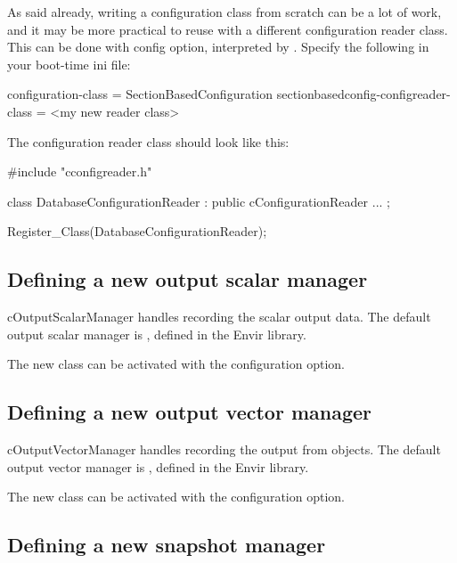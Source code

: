 As said already, writing a configuration class from scratch can
be a lot of work, and it may be more practical to reuse
 with a different configuration
reader class. This can be done with 
config option, interpreted by .
Specify the following in your boot-time ini file:

\begin{inifile}
[General]
configuration-class = SectionBasedConfiguration
sectionbasedconfig-configreader-class = <my new reader class>
\end{inifile}

The configuration reader class should look like this:

\begin{cpp}
#include "cconfigreader.h"

class DatabaseConfigurationReader : public cConfigurationReader
{
   ...
};

Register_Class(DatabaseConfigurationReader);
\end{cpp}


\subsection{Defining a new output scalar manager}
\label{sec:plugin-exts:outputscalarmanager}

cOutputScalarManager handles recording the scalar output data.
The default output scalar manager is ,
defined in the Envir library.

The new class can be activated with the 
configuration option.


\subsection{Defining a new output vector manager}
\label{sec:plugin-exts:outputvectormanager}

cOutputVectorManager handles recording the output from  objects.
The default output vector manager is ,
defined in the Envir library.

The new class can be activated with the 
configuration option.


\subsection{Defining a new snapshot manager}
\label{sec:plugin-exts:snapshotmanager}

